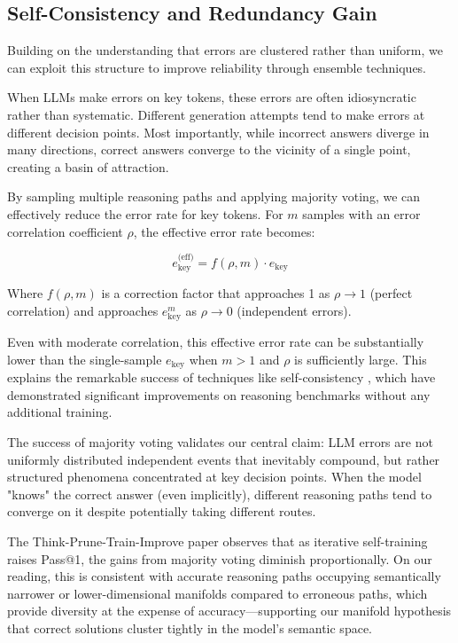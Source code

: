 \documentclass{article}
\begin{document}
\subsection{Self-Consistency and Redundancy Gain}

Building on the understanding that errors are clustered rather than uniform, we can exploit this structure to improve reliability through ensemble techniques.

When LLMs make errors on key tokens, these errors are often idiosyncratic rather than systematic. Different generation attempts tend to make errors at different decision points. Most importantly, while incorrect answers diverge in many directions, correct answers converge to the vicinity of a single point, creating a basin of attraction.

By sampling multiple reasoning paths and applying majority voting, we can effectively reduce the error rate for key tokens. For $m$ samples with an error correlation coefficient $\rho$, the effective error rate becomes:

\begin{equation}
e_{\text{key}}^{\text{(eff)}} = f(\rho, m) \cdot e_{\text{key}}
\end{equation}

Where $f(\rho, m)$ is a correction factor that approaches 1 as $\rho \to 1$ (perfect correlation) and approaches $e_{\text{key}}^m$ as $\rho \to 0$ (independent errors).

Even with moderate correlation, this effective error rate can be substantially lower than the single-sample $e_{\text{key}}$ when $m > 1$ and $\rho$ is sufficiently large. This explains the remarkable success of techniques like self-consistency \citep{wang2023self}, which have demonstrated significant improvements on reasoning benchmarks without any additional training.

The success of majority voting validates our central claim: LLM errors are not uniformly distributed independent events that inevitably compound, but rather structured phenomena concentrated at key decision points. When the model "knows" the correct answer (even implicitly), different reasoning paths tend to converge on it despite potentially taking different routes.

The Think-Prune-Train-Improve paper \citep{costello2025think} observes that as iterative self-training raises Pass@1, the gains from majority voting diminish proportionally. On our reading, this is consistent with accurate reasoning paths occupying semantically narrower or lower-dimensional manifolds compared to erroneous paths, which provide diversity at the expense of accuracy---supporting our manifold hypothesis that correct solutions cluster tightly in the model's semantic space.
\end{document}
